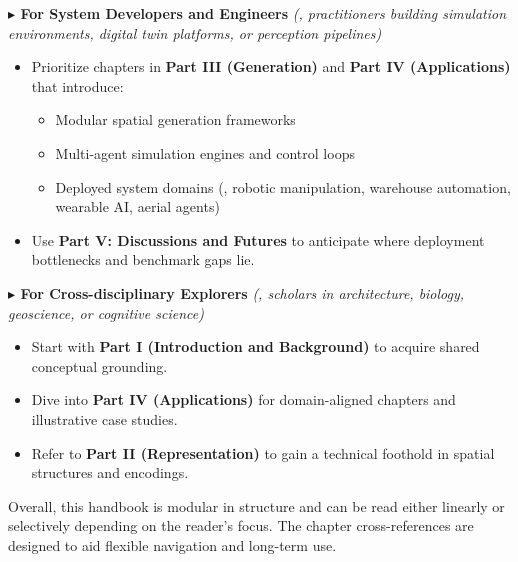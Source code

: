\vspace{0.5em}

\noindent\textbf{$\blacktriangleright$ For System Developers and Engineers} \textit{(\eg, practitioners building simulation environments, digital twin platforms, or perception pipelines)}
\begin{itemize}[leftmargin=2em,itemsep=0.35em]
    \item Prioritize chapters in \textbf{Part III (Generation)} and \textbf{Part IV (Applications)} that introduce:
    \begin{itemize}[leftmargin=2em,itemsep=0.35em]
        \item Modular spatial generation frameworks
        \item Multi-agent simulation engines and control loops
        \item Deployed system domains (\eg, robotic manipulation, warehouse automation, wearable AI, aerial agents)
    \end{itemize}
    \item Use \textbf{Part V: Discussions and Futures} to anticipate where deployment bottlenecks and benchmark gaps lie.
\end{itemize}

\vspace{0.5em}

\noindent\textbf{$\blacktriangleright$ For Cross-disciplinary Explorers} \textit{(\eg, scholars in architecture, biology, geoscience, or cognitive science)}
\begin{itemize}[leftmargin=2em,itemsep=0.35em]
    \item Start with \textbf{Part I (Introduction and Background)} to acquire shared conceptual grounding.
    \item Dive into \textbf{Part IV (Applications)} for domain-aligned chapters and illustrative case studies.
    \item Refer to \textbf{Part II (Representation)} to gain a technical foothold in spatial structures and encodings.
\end{itemize}

\vspace{1em}

\noindent Overall, this handbook is modular in structure and can be read either linearly or selectively depending on the reader's focus. The chapter cross-references are designed to aid flexible navigation and long-term use.



